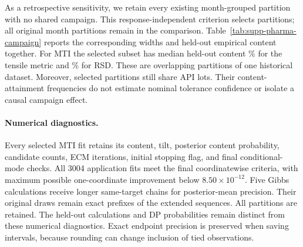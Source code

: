 \documentclass[11pt]{article}
\newcommand{\TableStyle}{\footnotesize\setlength{\tabcolsep}{4pt}\renewcommand{\arraystretch}{1.08}}
\begin{document}
As a retrospective sensitivity, we retain every existing month-grouped
partition with no shared campaign. This response-independent criterion selects
\PharmaCampaignDisjointMonths{} partitions; all \PharmaGroupedSplits{} original
month partitions remain in the comparison. Table~\ref{tab:supp-pharma-campaign}
reports the corresponding widths and held-out empirical content together.
For MTI the selected subset has median held-out content
\MTIFixedCampaignTensileContent\% for the tensile metric and
\MTIFixedCampaignRsdContent\% for RSD. These are overlapping partitions of one
historical dataset. Moreover, \PharmaCampaignDisjointApiShared{} selected
partitions still share API lots. Their content-attainment frequencies do not
estimate nominal tolerance confidence or isolate a causal campaign effect.

\begin{table}[H]
\centering
\caption{\textbf{Retrospective sensitivity to campaign sharing.} The
\PharmaCampaignDisjointMonths{} existing month-grouped partitions without
shared campaigns use \PharmaTrain{} training and \PharmaHeldout{} withheld
batches; no intervals are refitted. Width ranges give empirical
2.5\%--97.5\% quantiles. Content is median held-out empirical content;
\(\ge c\) is the percentage of partitions meeting the requested content.
The subset is retrospective and the partitions are not independent samples.}
\label{tab:supp-pharma-campaign}

\end{table}

\paragraph{Numerical diagnostics.}
Every selected MTI fit retains its content, tilt, posterior content
probability, candidate counts, ECM iterations, initial stopping flag, and
final conditional-mode checks. All 3004 application fits meet the final
coordinatewise criteria, with maximum possible one-coordinate improvement
below \(8.50\times10^{-12}\). Five Gibbs calculations receive longer
same-target chains for posterior-mean precision. Their original draws remain
exact prefixes of the extended sequences. All partitions are retained.
The held-out calculations and DP probabilities remain distinct from these
numerical diagnostics. Exact endpoint precision is preserved when saving
intervals, because rounding can change inclusion of tied observations.

\begin{table}[H]
\centering
\caption{\textbf{Numerical assessment of fixed-prior calculations.}
Mixing summaries range over lower endpoint, upper endpoint, width, and
midpoint. Coordinate gain is the largest possible objective improvement
from an exact one-root conditional minimization at the selected ECM fit.
Simulation summaries cover all 108,000 samples from twelve distributions;
the 3004 historical application fits are summarized separately.}
\label{tab:supp-pharma-numerical}
\TableStyle

\end{table}
\end{document}
